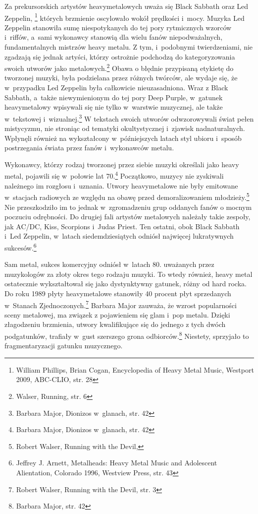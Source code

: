 \documentclass[12pt, a4paper, titlepage]{report}
\begin{document}
Za prekursorskich artystów heavymetalowych uważa się Black Sabbath oraz Led Zeppelin, \footnote{William Phillips, Brian Cogan, Encyclopedia of Heavy Metal Music, Westport 2009, ABC-CLIO, str. 28} których brzmienie oscylowało wokół prędkości i~mocy. Muzyka Led Zeppelin stanowiła sumę niespotykanych do tej pory rytmicznych wzorców i~riffów, a~sami wykonawcy stanowią dla wielu fanów niepodważalnych, fundamentalnych mistrzów heavy metalu. Z tym, i~podobnymi twierdzeniami, nie zgadzają się jednak artyści, którzy ostrożnie podchodzą do kategoryzowania swoich utworów jako metalowych.\footnote{Walser, Running, str. 6} Obawa o błędnie przypisaną  etykietę do tworzonej muzyki, była podzielana przez różnych twórców, ale wydaje się, że w~przypadku Led Zeppelin była całkowicie nieuzasadniona. Wraz z Black Sabbath, a~także niewymienionym do tej pory Deep Purple, w~gatunek heavymetalowy wpisywali się nie tylko w~warstwie muzycznej, ale także w~tekstowej i~wizualnej.\footnote{Barbara Major, Dionizos w~glanach, str. 42} W tekstach swoich utworów odwzorowywali świat pełen mistycyzmu, nie stroniąc od tematyki okultystycznej i~zjawisk nadnaturalnych. Wpłynęli również na wykształcony w~późniejszych latach styl ubioru i~sposób postrzegania świata przez fanów i~wykonawców metalu. 

Wykonawcy, którzy rodzaj tworzonej przez siebie muzyki określali jako heavy metal, pojawili się w~połowie lat 70.\footnote{Barbara Major, Dionizos w~glanach, str. 42} Początkowo, muzycy nie zyskiwali należnego im rozgłosu i~uznania. Utwory heavymetalowe nie były emitowane w~stacjach radiowych ze względu na obawę przed demoralizowaniem młodzieży.\footnote{Robert Walser, Running with the Devil, } Nie przeszkodziło im to jednak w~zgromadzeniu grup oddanych fanów o mocnym poczuciu odrębności. Do drugiej fali artystów metalowych należały takie zespoły, jak AC/DC, Kiss, Scorpions i~Judas Priest. Ten ostatni, obok Black Sabbath i~Led Zeppelin, w~latach siedemdziesiątych odniósł najwięcej lukratywnych sukcesów.\footnote{Jeffrey J. Arnett, Metalheads: Heavy Metal Music and Adolescent Alientation, Colorado 1996, Westview Press, str. 43}

Sam metal, sukces komercyjny odniósł w~latach 80. uważanych przez muzykologów za złoty okres tego rodzaju muzyki. To wtedy również, heavy metal ostatecznie wykształtował się jako dystynktywny gatunek, różny od hard rocka. Do roku 1989 płyty heavymetalowe stanowiły 40 procent płyt sprzedanych w~Stanach Zjednoczonych.\footnote{Robert Walser, Running with the Devil, str. 3} Barbara Major zauważa, że wzrost popularności sceny metalowej, ma związek z pojawieniem się glam i~pop metalu. Dzięki złagodzeniu brzmienia, utwory kwalifikujące się do jednego z tych dwóch podgatunków, trafiały w~gust szerszego grona odbiorców.\footnote{Barbara Major, str. 42} Niestety, sprzyjało to fragmentaryzacji gatunku muzycznego. 
\end{document}
